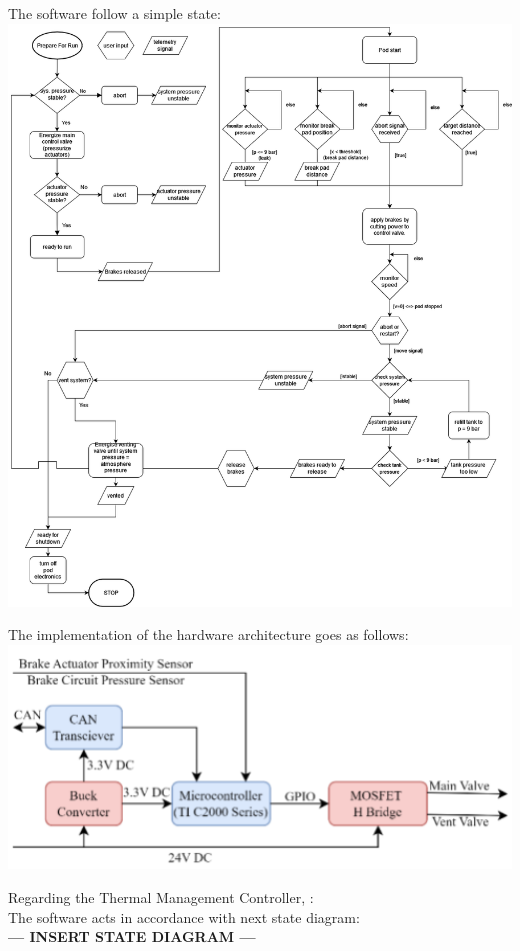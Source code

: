 The software follow a simple state: \\
\includegraphics[width=\textwidth]{texfiles/elec/eimg/brakesoftware_ext}

The implementation of the hardware architecture goes as follows:
\includegraphics[width=\textwidth]{texfiles/elec/eimg/Brakes_architecture}

Regarding the Thermal Management Controller, :\\ 

The software acts in accordance with next state diagram: \\
\textbf{--- INSERT STATE DIAGRAM ---}

